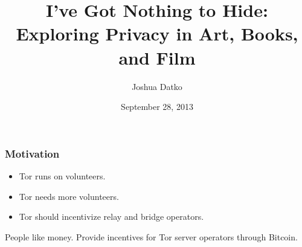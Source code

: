 \documentclass{beamer}
\title[Privacy in Art, Books, and Film]{I've Got Nothing to Hide: \\
  Exploring Privacy in Art, Books, and Film}
\author[Josh Datko]{Joshua Datko}
\institute[Drexel]{
  Department of Computer Science\\
  Drexel University\\
  Philadelphia, PA 19103\\[1ex]
}
\date[September 2013]{September 28, 2013}
\begin{document}
\begin{frame}[plain]
  \titlepage
\end{frame}


\begin{frame}
  \frametitle{Motivation}

  \begin{itemize}
  \item Tor runs on volunteers.
  \item Tor needs more volunteers.
  \item Tor should incentivize relay and bridge operators.
  \end{itemize}

  \begin{block}{People like money.}
    Provide incentives for Tor server operators through Bitcoin.
  \end{block}
\end{frame}








\end{document}
